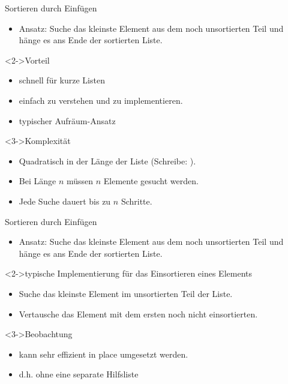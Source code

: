 \begin{frame}
    \begin{block}{Sortieren durch Einfügen}
        \begin{itemize}
            \item Ansatz: Suche das kleinste Element aus dem noch unsortierten Teil und hänge es ans Ende der sortierten Liste.
        \end{itemize}
    \end{block}
    \begin{block}<2->{Vorteil}
        \begin{itemize}
            \item schnell für kurze Listen
            \item einfach zu verstehen und zu implementieren.
            \item typischer Aufräum-Ansatz
        \end{itemize}
    \end{block}
    \begin{block}<3->{Komplexität}
        \begin{itemize}
            \item Quadratisch in der Länge der Liste  (Schreibe: \alert{\osquare}).
            \item Bei Länge $n$ müssen $n$ Elemente gesucht werden.
            \item Jede Suche dauert bis zu $n$ Schritte.
        \end{itemize}
    \end{block}
\end{frame}

\begin{frame}
    \begin{block}{Sortieren durch Einfügen}
        \begin{itemize}
            \item Ansatz: Suche das kleinste Element aus dem noch unsortierten Teil und hänge es ans Ende der sortierten Liste.
        \end{itemize}
    \end{block}
    \begin{block}<2->{typische Implementierung für das Einsortieren eines Elements}
        \begin{itemize}
            \item Suche das kleinste Element im unsortierten Teil der Liste.
            \item Vertausche das Element mit dem ersten noch nicht einsortierten.
        \end{itemize}
    \end{block}
    \begin{block}<3->{Beobachtung}
        \begin{itemize}
            \item kann sehr effizient \alert{in place} umgesetzt werden.
            \item d.h. ohne eine separate Hilfsliste
        \end{itemize}
    \end{block}
\end{frame}